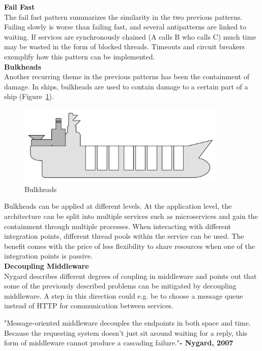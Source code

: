 \noindent \textbf{Fail Fast}
\\
The fail fast pattern summarizes the similarity in the two previous patterns. Failing slowly is worse than failing fast, and several antipatterns are linked to waiting. If services are synchronously chained (A calls B who calls C) much time may be wasted in the form of blocked threads. Timeouts and circuit breakers exemplify how this pattern can be implemented. \\

\noindent \textbf{Bulkheads}
\\
Another recurring theme in the previous patterns has been the containment of damage. In ships, bulkheads are used to contain damage to a certain part of a ship (Figure~\ref{fig:bulkheads}). 

\begin{figure}[H]
    \centering
    \includegraphics[width=10cm]{figures/bulkheads}
    \caption{Bulkheads}
    \label{fig:bulkheads}
\end{figure}

\noindent
Bulkheads can be applied at different levels. At the application level, the architecture can be split into multiple services such as microservices and gain the containment through multiple processes. 
When interacting with different integration points, different thread pools within the service can be used. The benefit comes with the price of less flexibility to share resources when one of the integration points is passive. \\

\noindent \textbf{Decoupling Middleware}
\\
Nygard describes different degrees of coupling in middleware and points out that some of the previously described problems can be mitigated by decoupling middleware. A step in this direction could e.g. be to choose a message queue instead of HTTP for communication between services.

\begin{citat} []
"Message-oriented middleware decouples the endpoints in both space and time. Because the requesting system doesn't just sit around waiting for a reply, this form of middleware cannot produce a cascading failure."\textbf{- Nygard, 2007} \cite[p. 115]{nygard2007release}
\end{citat}

